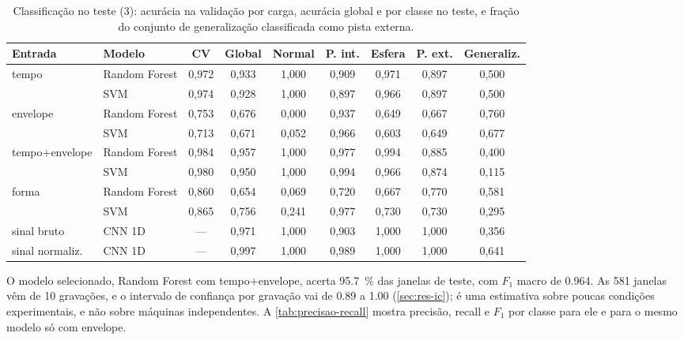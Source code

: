 \begin{table}[htb]
  \centering
  \caption{Classificação no teste (\SI{3}{\hp}): acurácia na validação por carga,
  acurácia global e por classe no teste, e fração do conjunto de generalização
  classificada como pista externa.}
  \label{tab:classificacao}
  \scriptsize
  \begin{tabular}{llccccccc}
    \toprule
    \textbf{Entrada} & \textbf{Modelo} & \textbf{CV} & \textbf{Global} & \textbf{Normal} &
    \textbf{P. int.} & \textbf{Esfera} & \textbf{P. ext.} & \textbf{Generaliz.} \\
    \midrule
    tempo          & Random Forest & 0,972 & 0,933 & 1,000 & 0,909 & 0,971 & 0,897 & 0,500 \\
                   & SVM           & 0,974 & 0,928 & 1,000 & 0,897 & 0,966 & 0,897 & 0,500 \\
    envelope       & Random Forest & 0,753 & 0,676 & 0,000 & 0,937 & 0,649 & 0,667 & 0,760 \\
                   & SVM           & 0,713 & 0,671 & 0,052 & 0,966 & 0,603 & 0,649 & 0,677 \\
    tempo+envelope & Random Forest & 0,984 & 0,957 & 1,000 & 0,977 & 0,994 & 0,885 & 0,400 \\
                   & SVM           & 0,980 & 0,950 & 1,000 & 0,994 & 0,966 & 0,874 & 0,115 \\
    forma          & Random Forest & 0,860 & 0,654 & 0,069 & 0,720 & 0,667 & 0,770 & 0,581 \\
                   & SVM           & 0,865 & 0,756 & 0,241 & 0,977 & 0,730 & 0,730 & 0,295 \\
    \midrule
    sinal bruto    & CNN 1D        & ---   & 0,971 & 1,000 & 0,903 & 1,000 & 1,000 & 0,356 \\
    sinal normaliz.& CNN 1D        & ---   & 0,997 & 1,000 & 0,989 & 1,000 & 1,000 & 0,641 \\
    \bottomrule
  \end{tabular}
\end{table}

O modelo selecionado, Random Forest com tempo+envelope, acerta
\SI{95.7}{\percent} das janelas de teste, com $F_1$ macro de \num{0.964}. As 581
janelas vêm de 10 gravações, e o intervalo de confiança por gravação vai de
\num{0.89} a \num{1.00} (\autoref{sec:res-ic}); é uma estimativa sobre poucas
condições experimentais, e não sobre máquinas independentes. A
\autoref{tab:precisao-recall} mostra precisão, recall e $F_1$ por classe para ele
e para o mesmo modelo só com envelope.


